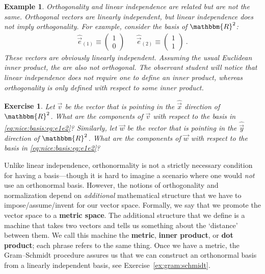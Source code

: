 \documentclass[
  11pt,
	colorful,
	raggedright,
]{tufte-style-thesis-flip}
\newtheorem{exercise}{Exercise}[section]
\newtheorem{example}{Example}[section]
\begin{document}
\begin{example}
Orthogonality and linear independence are related but are not the same. Orthogonal vectors are linearly independent, but linear independence does not imply orthogonality. For example, consider the basis of $\mathbbm{R}^2$:
\begin{align}
 \hat{\vec{e}}_{(1)} \equiv 
  \begin{pmatrix}
    1\\0
  \end{pmatrix}
  &&
 \hat{\vec{e}}_{(2)} \equiv 
  \begin{pmatrix}
    1\\1
  \end{pmatrix} 
  \label{eq:nice:basis:eg:e1e2}
  \ .
\end{align}
These vectors are obviously linearly independent. Assuming the usual Euclidean inner product, the are also \emph{not} orthogonal. The observant student will notice that linear independence does not require one to define an inner product, whereas orthogonality is only defined with respect to some inner product.
\end{example}
\begin{exercise}
Let $\vec{v}$ be the vector that is pointing in the $\hat{\vec{x}}$ direction of $\mathbbm{R}^2$.  What are the components of $\vec{v}$ with respect to the basis in \eqref{eq:nice:basis:eg:e1e2}? Similarly, let $\vec{w}$ be the vector that is pointing in the $\hat{\vec{y}}$ direction of $\mathbbm{R}^2$. What are the components of $\vec{w}$ with respect to the basis in \eqref{eq:nice:basis:eg:e1e2}?
\end{exercise}
Unlike linear independence, orthonormality is not a strictly necessary condition for having a basis---though it is hard to imagine a scenario where one would \emph{not} use an orthonormal basis. However, the notions of orthogonality and normalization depend on \emph{additional} mathematical structure that we have to impose/assume/invent for our vector space. Formally, we say that we promote the vector space to a \textbf{metric space}. The additional structure that we define is a machine that takes two vectors and tells us something about the `distance' between them. We call this machine the \textbf{metric}, \textbf{inner product}, or \textbf{dot product}; each phrase refers to the same thing. Once we have a metric, the Gram--Schmidt procedure assures us that we can construct an orthonormal basis from a linearly independent basis, see Exercise~\ref{ex:gram:schmidt}. 
\end{document}

